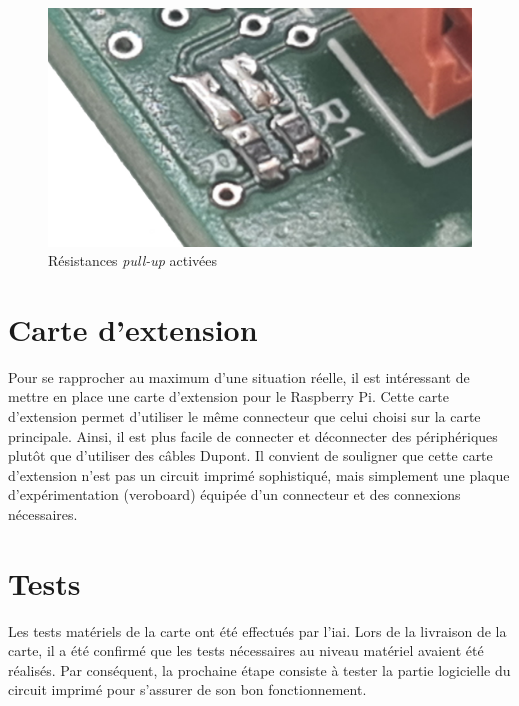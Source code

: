 \begin{figure}[H]
    \centering
    \includegraphics[scale=0.1]{./assets/figures/resistance_active.jpg}
    \caption{Résistances \textit{pull-up} activées}
\end{figure}

\section{Carte d'extension}

Pour se rapprocher au maximum d'une situation réelle, il est intéressant de mettre en place une carte d'extension pour le Raspberry Pi.
Cette carte d'extension permet d'utiliser le même connecteur que celui choisi sur la carte principale.
Ainsi, il est plus facile de connecter et déconnecter des périphériques plutôt que d'utiliser des câbles Dupont.
Il convient de souligner que cette carte d'extension n'est pas un circuit imprimé sophistiqué, mais simplement une plaque d'expérimentation (veroboard) équipée d'un connecteur et des connexions nécessaires.

\section{Tests}

Les tests matériels de la carte ont été effectués par l'\gls{iai}.
Lors de la livraison de la carte, il a été confirmé que les tests nécessaires au niveau matériel avaient été réalisés.
Par conséquent, la prochaine étape consiste à tester la partie logicielle du circuit imprimé pour s'assurer de son bon fonctionnement.

